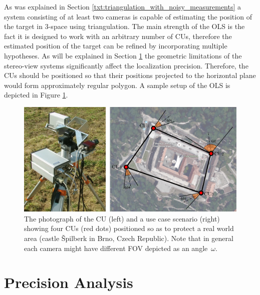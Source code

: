 As was explained in Section \ref{txt:triangulation_with_noisy_measurements} a system consisting of at least two cameras is capable of estimating the position of the target in 3-space using triangulation. The main strength of the OLS is the fact it is designed to work with an arbitrary number of CUs, therefore the estimated position of the target can be refined by incorporating multiple hypotheses. As will be explained in Section \ref{txt:precision_analysis} the geometric limitations of the stereo-view systems significantly affect the localization precision. Therefore, the CUs should be positioned so that their positions projected to the horizontal plane would form approximately regular polygon. A sample setup of the OLS is depicted in Figure \ref{fig:cu_and_topology}.

\begin{figure}[htb]\centering
	\centering
	\includegraphics[width=0.75\linewidth]{fig/cu_and_spilberk_camera_units.pdf}
	\caption{The photograph of the CU (left) and a use case scenario (right) showing four CUs (red dots) positioned so as to protect a real world area (castle Špilberk in Brno, Czech Republic). Note that in general each camera might have different FOV depicted as an angle~$\omega$.}
	\label{fig:cu_and_topology}
\end{figure}

\section{Precision Analysis} \label{txt:precision_analysis}


